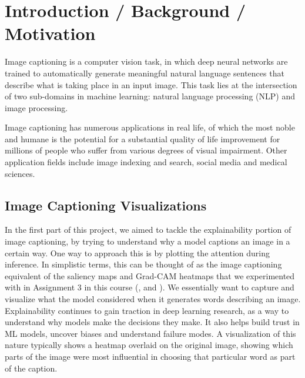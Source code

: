 \documentclass[10pt,twocolumn,letterpaper]{article}
\begin{document}
\section{Introduction / Background / Motivation}
Image captioning is a computer vision task, in which deep neural networks are trained to automatically generate meaningful natural language sentences that describe what is taking place in an input image. This task lies at the intersection of two sub-domains in machine learning: natural language processing (NLP) and image processing.

Image captioning has numerous applications in real life, of which the most noble and humane is the potential for a substantial quality of life improvement for millions of people who suffer from various degrees of visual impairment. Other application fields include image indexing and search, social media and medical sciences.\\

\subsection{Image Captioning Visualizations}
In the first part of this project, we aimed to tackle the explainability portion of image captioning, by trying to understand why a model captions an image in a certain way. One way to approach this is by plotting the attention during inference. In simplistic terms, this can be thought of as the image captioning equivalent of the saliency maps and Grad-CAM heatmaps that we experimented with in Assignment 3 in this course (\cite{zeiler2014visualizing}, \cite{simonyan2013deep} and \cite{selvaraju2017grad}). We essentially  want to capture and visualize what the model considered when it generates words describing an image. Explainability continues to gain traction in deep learning research, as a way to understand why models make the decisions they make. It also helps build trust in ML models, uncover biases and understand failure modes. A visualization of this nature typically shows a heatmap overlaid on the original image, showing which parts of the image were most influential in choosing that particular word as part of the caption.
\end{document}
